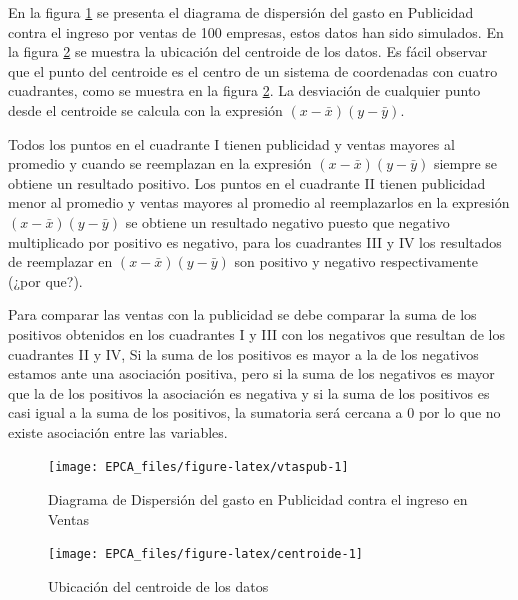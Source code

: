 \documentclass[letterpaper,]{book}
\begin{document}
En la figura \ref{fig:vtaspub} se presenta el diagrama de dispersión del gasto en Publicidad contra el ingreso por ventas de 100 empresas, estos datos han sido simulados. En la figura \ref{fig:centroide} se muestra la ubicación del centroide de los datos. Es fácil observar que el punto del centroide es el centro de un sistema de coordenadas con cuatro cuadrantes, como se muestra en la figura \ref{fig:centroide}. La desviación de cualquier punto desde el centroide se calcula con la expresión \(\left(x-\bar{x}\right)\left(y-\bar{y}\right)\).

Todos los puntos en el cuadrante I tienen publicidad y ventas mayores al promedio y cuando se reemplazan en la expresión \(\left(x-\bar{x}\right)\left(y-\bar{y}\right)\) siempre se obtiene un resultado positivo. Los puntos en el cuadrante II tienen publicidad menor al promedio y ventas mayores al promedio al reemplazarlos en la expresión \(\left(x-\bar{x}\right)\left(y-\bar{y}\right)\) se obtiene un resultado negativo puesto que negativo multiplicado por positivo es negativo, para los cuadrantes III y IV los resultados de reemplazar en \(\left(x-\bar{x}\right)\left(y-\bar{y}\right)\) son positivo y negativo respectivamente (¿por que?).

Para comparar las ventas con la publicidad se debe comparar la suma de los positivos obtenidos en los cuadrantes I y III con los negativos que resultan de los cuadrantes II y IV, Si la suma de los positivos es mayor a la de los negativos estamos ante una asociación positiva, pero si la suma de los negativos es mayor que la de los positivos la asociación es negativa y si la suma de los positivos es casi igual a la suma de los positivos, la sumatoria será cercana a \(0\) por lo que no existe asociación entre las variables.

\begin{figure}[!h]

{\centering \texttt{[image: EPCA\_files/figure-latex/vtaspub-1]} 

}

\caption{Diagrama de Dispersión del gasto en Publicidad contra el ingreso en Ventas}\label{fig:vtaspub}
\end{figure}

\begin{figure}[!h]

{\centering \texttt{[image: EPCA\_files/figure-latex/centroide-1]} 

}

\caption{Ubicación del centroide de los datos}\label{fig:centroide}
\end{figure}
\end{document}
